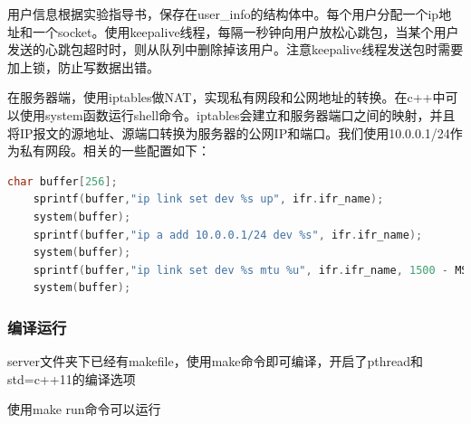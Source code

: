 \documentclass[paper=a4, fontsize=11pt, UTF8]{article} %
\begin{document}
用户信息根据实验指导书，保存在user\_info的结构体中。每个用户分配一个ip地址和一个socket。使用keepalive线程，每隔一秒钟向用户放松心跳包，当某个用户发送的心跳包超时时，则从队列中删除掉该用户。注意keepalive线程发送包时需要加上锁，防止写数据出错。

在服务器端，使用iptables做NAT，实现私有网段和公网地址的转换。在c++中可以使用system函数运行shell命令。iptables会建立和服务器端口之间的映射，并且将IP报文的源地址、源端口转换为服务器的公网IP和端口。我们使用10.0.0.1/24作为私有网段。相关的一些配置如下：
\begin{lstlisting}[language=c++]
    char buffer[256];
    sprintf(buffer,"ip link set dev %s up", ifr.ifr_name);
    system(buffer);
    sprintf(buffer,"ip a add 10.0.0.1/24 dev %s", ifr.ifr_name);
    system(buffer);
    sprintf(buffer,"ip link set dev %s mtu %u", ifr.ifr_name, 1500 - MSG_HEADER_SIZE);
    system(buffer);
\end{lstlisting}

\subsubsection{编译运行}
server文件夹下已经有makefile，使用make命令即可编译，开启了pthread和std=c++11的编译选项

使用make run命令可以运行
\end{document}
